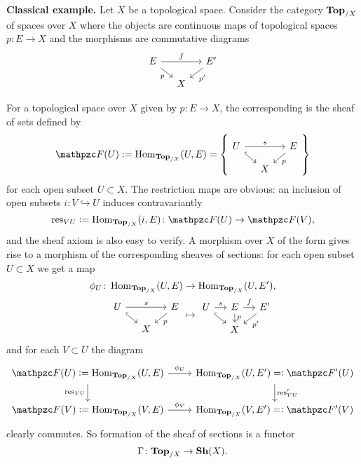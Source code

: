 \begin{nameless}\textbf{Classical example.}
  Let $X$ be a topological space. Consider the category $\text{\bf Top}_{/X}$ of
  spaces over $X$ where the objects are continuous maps of topological spaces
  $p\colon E\to X$ and the morphisms are commutative diagrams
  \begin{equation}
    \label{eqn:morphism-of-spaces-over-X}
    \begin{tikzcd}[row sep=small, column sep=small]
      E\ar{rr}{f}\ar{dr}[swap]{p} && E'\ar{dl}{p'} \\
      & X
    \end{tikzcd}
  \end{equation}

  For a topological space over $X$ given by $p\colon E\to X$, the corresponding
   is the sheaf of sets defined by
  \[ \mathcal{F} (U) \dfn \Hom_{\categ{Top}_{/X}} (U, E) =
    \left\{ \begin{tikzcd}[row sep=small, column sep=small]
        U \ar{rr}{s}\ar[hookrightarrow]{dr} & & E\ar{dl}{p} \\
        & X
      \end{tikzcd} \right\} \]
  for each open subset $U \subset X$. The restriction maps are obvious:
  an inclusion of open subsets $i\colon V \hookrightarrow U$ induces
  contravariantly
  \[ \res_{VU} \dfn \Hom_{\categ{Top}_{/X}} (i, E)\colon
    \mathcal{F} (U) \to \mathcal{F} (V), \]
  and the sheaf axiom is also easy to verify. A morphism over $X$ of the form
   gives rise to a morphism of the
  corresponding sheaves of sections: for each open subset $U \subset X$ we get a
  map
  \begin{align*}
    \phi_U\colon \Hom_{\categ{Top}_{/X}} (U, E) & \to \Hom_{\categ{Top}_{/X}} (U, E'),\\
    \begin{tikzcd}[row sep=small, column sep=small,ampersand replacement=\&] U
      \ar{rr}{s}\ar[hookrightarrow]{dr} \&\& E\ar{dl}{p} \\
      \& X
    \end{tikzcd} & \mapsto \begin{tikzcd}[row sep=small, column sep=small,ampersand replacement=\&]
      U \ar{r}{s}\ar[hookrightarrow]{dr} \& E\ar{d}{p}\ar{r}{f} \& E'\ar{dl}{p'} \\
      \& X
    \end{tikzcd}
  \end{align*}
  and for each $V\subset U$ the diagram
  \[ \begin{tikzcd}
      \mathcal{F} (U) \dfn \Hom_{\categ{Top}_{/X}} (U, E)\ar{r}{\phi_U}\ar{d}[swap]{\res_{VU}} & \Hom_{\categ{Top}_{/X}} (U, E')\ar{d}{\res_{VU}'} \rdfn \mathcal{F}' (U) \\
      \mathcal{F} (V) \dfn \Hom_{\categ{Top}_{/X}} (V, E)\ar{r}{\phi_V} & \Hom_{\categ{Top}_{/X}} (V, E') \rdfn \mathcal{F}' (V)
    \end{tikzcd} \]
  clearly commutes. So formation of the sheaf of sections is a functor
  $$\Gamma\colon \text{\bf Top}_{/X} \to \text{\bf Sh} (X).$$
\end{nameless}

